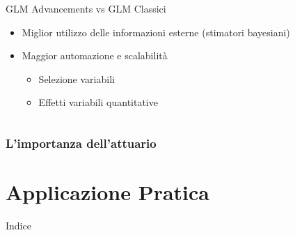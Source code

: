 \documentclass[pdf, aspectratio=169]{beamer}\usepackage[]{graphicx}\usepackage[]{color}
\theoremstyle{definition}
\begin{document}
\begin{frame}
\begin{columns}[T]
{\begin{column}{0.5\linewidth}
\begin{block}{GLM Advancements vs GLM Classici \vphantom{/}}
\begin{itemize}
        \item[\textcolor{ForestGreen}{\faThumbsOUp}] Miglior utilizzo delle informazioni esterne (stimatori bayesiani)
        \item[\textcolor{ForestGreen}{\faThumbsOUp}] Maggior automazione e scalabilità
          \begin{itemize}
            \fontsize{9pt}{11pt}\selectfont
            \item[\textcolor{ForestGreen}{\faCaretRight}] Selezione variabili
            \item[\textcolor{ForestGreen}{\faCaretRight}] Effetti variabili quantitative
          \end{itemize}
      \end{itemize}
    \end{block}
  \end{column}
}

\end{columns}

\end{frame}


\begin{frame}
\frametitle{L'importanza dell'attuario}

\end{frame}




\section{Applicazione Pratica}

\begin{frame}{Indice}
  \tableofcontents[currentsection]
\end{frame}
\end{document}
